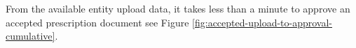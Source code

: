 From the available entity upload data, it takes less than a minute to
approve an accepted prescription document see Figure
\ref{fig:accepted-upload-to-approval-cumulative}.











